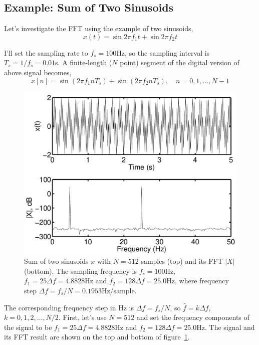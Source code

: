 \subsection{Example: Sum of Two Sinusoids}

Let's investigate the FFT using the example of two sinusoids,
\begin{equation}
x(t) = \sin 2\pi f_1 t + \sin 2\pi f_2 t
\end{equation}

I'll set the sampling rate to $f_s=100$Hz, so the sampling interval is
$T_s=1/f_s=0.01$s. A finite-length ($N$ point) segment of the digital
version of above signal becomes,
\begin{equation}
x[n] = \sin(2\pi f_1 n T_s) + \sin(2\pi f_2 n T_s),
      \quad n=0,1,\ldots, N-1
\end{equation}

\begin{figure}
\centerline{\includegraphics[width=5in]{ch-fft/fft_sin_xX}}
\caption[Sum of two sinusoids $x$ with $N=512$ samples and its 
FFT $|X|$]{Sum of two sinusoids $x$ with $N=512$ samples (top) and its
FFT $|X|$ (bottom). The sampling frequency is $f_s=100$Hz, $f_1=25
\Delta f=4.8828$Hz and $f_2=128 \Delta f=25.0$Hz, where frequency step
$\Delta f=f_s/N=0.1953$Hz/sample.
\label{fig:fft-sin-xX}}
\end{figure}

The corresponding frequency step in Hz is $\Delta f=f_s/N$, so
$\hat{f}=k \Delta f$, $k=0, 1,2,\ldots, N/2$. First, let's use $N=512$
and set the frequency components of the signal to be $f_1=25 \Delta
f=4.8828$Hz and $f_2=128 \Delta f=25.0$Hz. The signal and its FFT
result are shown on the top and bottom of figure~\ref{fig:fft-sin-xX}.

